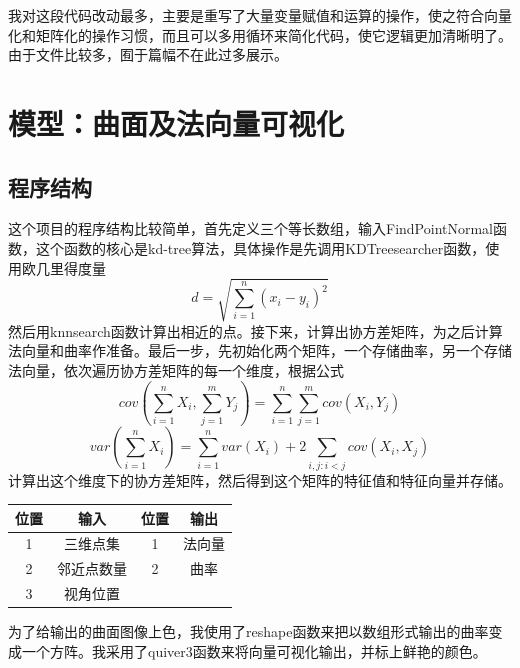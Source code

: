 \documentclass[a4paper, 14pt, twocolumn]{article}
\theoremstyle{definition}
\begin{document}

\qquad 我对这段代码改动最多，主要是重写了大量变量赋值和运算的操作，使之符合向量化和矩阵化的操作习惯，而且可以多用循环来简化代码，使它逻辑更加清晰明了。由于文件比较多，囿于篇幅不在此过多展示。
\section{模型：曲面及法向量可视化}
\subsection{程序结构}
这个项目的程序结构比较简单\cite{3d normals and curvature}，首先定义三个等长数组，输入FindPointNormal函数，这个函数的核心是kd-tree算法，具体操作是先调用KDTreesearcher函数，使用欧几里得度量
\begin{equation*}
d=\sqrt{\sum_{i=1}^{n}(x_i-y_i)^2}
\end{equation*}
然后用knnsearch函数计算出相近的点。接下来，计算出协方差矩阵，为之后计算法向量和曲率作准备。最后一步，先初始化两个矩阵，一个存储曲率，另一个存储法向量，依次遍历协方差矩阵的每一个维度，根据公式
\begin{equation*}
cov(\sum_{i=1}^{n}X_i,\sum_{j=1}^{m}Y_j)=\sum_{i=1}^{n}\sum_{j=1}^{m}cov(X_i,Y_j)
\end{equation*}
\begin{equation*}
var(\sum_{i=1}^{n}X_i)=\sum_{i=1}^{n}var(X_i)+2\sum_{i,j:i<j}cov(X_i,X_j)
\end{equation*}
计算出这个维度下的协方差矩阵，然后得到这个矩阵的特征值和特征向量并存储。\\
\begin{tabular}{|c|c|c|c|}
\hline
位置 & 输入 & 位置 & 输出\\
\hline
1 & 三维点集 & 1 & 法向量\\
\hline
2 & 邻近点数量 & 2 &曲率\\
\hline
3 & 视角位置 & & \\
\hline
\end{tabular}
\qquad \qquad \qquad
为了给输出的曲面图像上色，我使用了reshape函数来把以数组形式输出的曲率变成一个方阵。我采用了quiver3函数来将向量可视化输出，并标上鲜艳的颜色。
\end{document}
